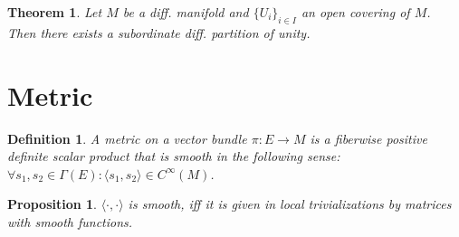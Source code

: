 \documentclass{scrartcl}
\newtheorem*{mydef}{Definition}
\newtheorem*{prop}{Proposition}
\newtheorem*{thm}{Theorem}
\begin{document}
\begin{thm}
  Let $M$ be a diff. manifold and $\{U_i\}_{i\in I}$ an open covering of $M$. Then there exists a subordinate diff. partition of unity.
\end{thm}

\section{Metric}

\begin{mydef}
  A \emph{metric} on a vector bundle $\pi:E\rightarrow M$ is a fiberwise positive definite scalar product that is smooth in the following sense: $\forall s_1,s_2\in \Gamma(E): \langle s_1,s_2 \rangle \in C^\infty(M)$.
\end{mydef}

\begin{prop}
  $\langle \cdot, \cdot \rangle$ is smooth, iff it is given in local trivializations by matrices with smooth functions.
\end{prop}
\end{document}
